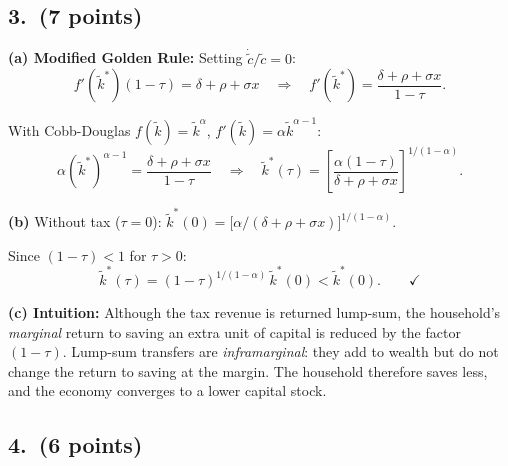 \documentclass[a4paper,11pt]{article}
\newcommand{\ktilde}{\tilde{k}}
\newcommand{\ctilde}{\tilde{c}}
\begin{document}
\subsection*{3.\ (7 points)}

\begin{answerbox}
\textbf{(a) Modified Golden Rule:}  Setting $\dot{\ctilde}/\ctilde = 0$:
\[
    f'(\ktilde^*)(1-\tau) = \delta + \rho + \sigma x
    \quad\Longrightarrow\quad
    f'(\ktilde^*) = \frac{\delta + \rho + \sigma x}{1-\tau}.
\]

With Cobb-Douglas $f(\ktilde) = \ktilde^{\alpha}$, $f'(\ktilde) = \alpha\ktilde^{\alpha-1}$:
\[
    \alpha(\ktilde^*)^{\alpha-1} = \frac{\delta + \rho + \sigma x}{1-\tau}
    \quad\Longrightarrow\quad
    \boxed{\ktilde^*(\tau) = \left[\frac{\alpha(1-\tau)}{\delta + \rho + \sigma x}\right]^{1/(1-\alpha)}.}
\]

\textbf{(b)} Without tax ($\tau=0$):
$\ktilde^*(0) = \bigl[\alpha/(\delta+\rho+\sigma x)\bigr]^{1/(1-\alpha)}$.

Since $(1-\tau) < 1$ for $\tau > 0$:
\[
    \ktilde^*(\tau) = (1-\tau)^{1/(1-\alpha)}\,\ktilde^*(0) < \ktilde^*(0). \qquad\checkmark
\]

\textbf{(c) Intuition:} Although the tax revenue is returned lump-sum, the household's
\emph{marginal} return to saving an extra unit of capital is reduced by the factor $(1-\tau)$.
Lump-sum transfers are \emph{inframarginal}: they add to wealth but do not change the
return to saving at the margin.  The household therefore saves less, and the economy
converges to a lower capital stock.
\end{answerbox}

\subsection*{4.\ (6 points)}
\end{document}
